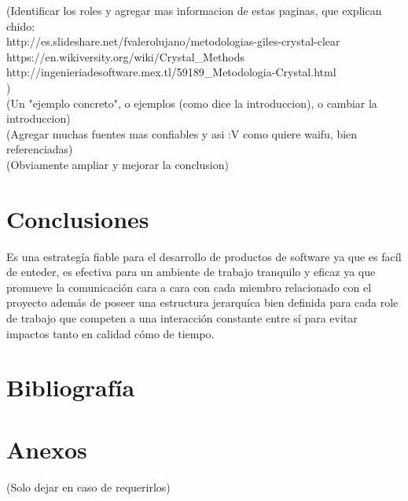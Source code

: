 \documentclass[12pt,a4paper]{article}
\begin{document}
	(Identificar los roles y agregar mas informacion de estas paginas, que explican chido:\\
	http://es.slideshare.net/fvalerolujano/metodologias-giles-crystal-clear \\
	https://en.wikiversity.org/wiki/Crystal\_Methods \\
	http://ingenieriadesoftware.mex.tl/59189\_Metodologia-Crystal.html \\
	)\\
	
	(Un "ejemplo concreto", o ejemplos (como dice la introduccion), o cambiar la introduccion)\\
	
	(Agregar muchas fuentes mas confiables y asi :V como quiere waifu, bien referenciadas)\\
	
	(Obviamente ampliar y mejorar la conclusion)\\
	
	\section{Conclusiones}
	Es una estrateg\'ia fiable para el desarrollo de productos de software ya que es fac\'il de enteder, es efectiva para un ambiente de trabajo tranquilo y eficaz ya que promueve la comunicaci\'on cara a cara con cada miembro relacionado con el proyecto además de poseer una estructura jerarqu\'ica bien definida para cada role de trabajo que competen a una interacci\'on constante entre s\'i para evitar impactos tanto en calidad c\'omo de tiempo.
	  
	
	\section{Bibliografía}
	
	\section{Anexos}
	(Solo dejar en caso de requerirlos)
\end{document}

